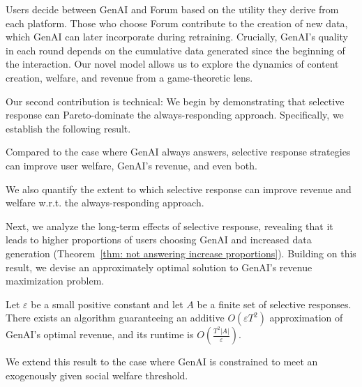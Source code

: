 Users decide between GenAI and Forum based on the utility they derive from each platform. Those who choose Forum contribute to the creation of new data, which GenAI can later incorporate during retraining. Crucially, GenAI's quality in each round depends on the cumulative data generated since the beginning of the interaction. Our novel model allows us to explore the dynamics of content creation, welfare, and revenue from a game-theoretic lens.


Our second contribution is technical: We begin by demonstrating that selective response can   Pareto-dominate the always-responding approach. Specifically, we establish the following result.
\begin{theorem} 
Compared to the case where GenAI always answers, selective response strategies can improve user welfare, GenAI's revenue, and even both.
\end{theorem}
We also quantify the extent to which selective response can improve revenue and welfare w.r.t. the always-responding approach.

Next, we analyze the long-term effects of selective response, revealing that it leads to higher proportions of users choosing GenAI and increased data generation (Theorem~\ref{thm: not answering increase proportions}). Building on this result, we devise an approximately optimal solution to GenAI's revenue maximization problem. 
\begin{theorem} 
Let $\varepsilon$ be a small positive constant and let $A$ be a finite set of selective responses. There exists an algorithm guaranteeing an additive $ O(\varepsilon T^2)$ approximation of GenAI's optimal revenue, and its runtime is $O\left(\frac{T^2 \left| A \right|}{\varepsilon}\right)$.
\end{theorem}
We extend this result to the case where GenAI is constrained to meet an exogenously given social welfare threshold.

